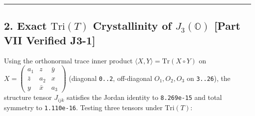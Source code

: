 \documentclass[
  a4paper,
]{article}
\begin{document}
\begin{center}\rule{0.5\linewidth}{0.5pt}\end{center}

\subsection{\texorpdfstring{2. Exact \(\mathrm{Tri}(T)\) Crystallinity
of \(J_3(\mathbb{O})\) {[}Part VII Verified
J3-1{]}}{2. Exact \textbackslash mathrm\{Tri\}(T) Crystallinity of J\_3(\textbackslash mathbb\{O\}) {[}Part VII Verified J3-1{]}}}\label{exact-mathrmtrit-crystallinity-of-j_3mathbbo-part-vii-verified-j3-1}

Using the orthonormal trace inner product
\(\langle X, Y \rangle = \mathrm{Tr}(X\circ Y)\) on
\(X = \begin{pmatrix} a_1 & z & \bar{y} \\ \bar{z} & a_2 & x \\ y & \bar{x} & a_3 \end{pmatrix}\)
(diagonal \texttt{0..2}, off-diagonal \(O_1, O_2, O_3\) on
\texttt{3..26}), the structure tensor \(J_{ijk}\) satisfies the Jordan
identity to \texttt{8.269e-15} and total symmetry to \texttt{1.110e-16}.
Testing three tensors under \(\mathrm{Tri}(T)\):
\end{document}
